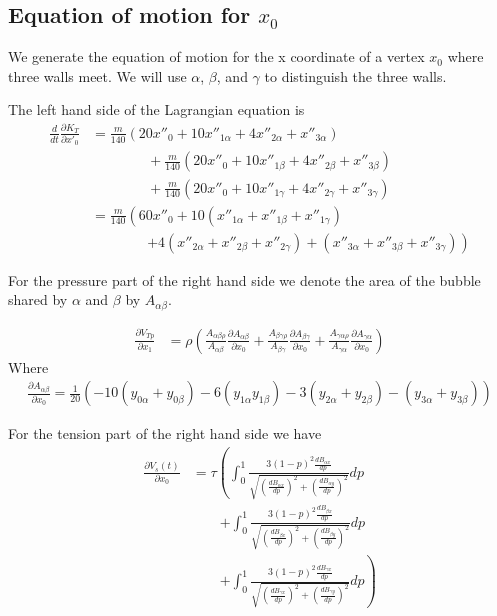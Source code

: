 \documentclass{article}
\begin{document}
\subsection{Equation of motion for $x_0$}
We generate the equation of motion for the x coordinate of a vertex $x_0$ where
three walls meet. We will use $\alpha$, $\beta$, and $\gamma$ to distinguish the
three walls.

The left hand side of the Lagrangian equation is 
\begin{align}
\frac{d}{d t} \frac{\partial K_T}{\partial x'_0}&=
\frac{m}{140}  \left( 20x''_0+10x''_{1\alpha}+4x''_{2\alpha}+x''_{3\alpha} \right)\\
&\qquad\qquad +\frac{m}{140}\left(
20x''_0+10x''_{1\beta}+4x''_{2\beta}+x''_{3\beta}\right)\nonumber\\ 
&\qquad\qquad +\frac{m}{140} \left(
20x''_0+10x''_{1\gamma}+4x''_{2\gamma}+x''_{3\gamma} \right)\nonumber\\
 &=\frac{m}{140} \left(
60x''_0
+10(x''_{1\alpha}+x''_{1\beta}+x''_{1\gamma})\right.\nonumber\\
&\qquad\qquad \left.+4(x''_{2\alpha}+x''_{2\beta}+x''_{2\gamma})
+(x''_{3\alpha}+x''_{3\beta}+x''_{3\gamma}) \right)\nonumber
\end{align}

For the pressure part of the right hand side we denote the area of the bubble
shared by $\alpha$ and $\beta$ by $A_{\alpha\beta}$.

\begin{align*}
\frac{\partial V_{Tp}}{\partial x_1} &= 
\rho \left(
\frac{A_{\alpha\beta\rho}}{A_{\alpha\beta}} \frac{\partial
A_{\alpha\beta}}{\partial x_0} 
+\frac{A_{\beta\gamma\rho}}{A_{\beta\gamma}} \frac{\partial
A_{\beta\gamma}}{\partial x_0} 
+\frac{A_{\gamma\alpha\rho}}{A_{\gamma\alpha}} \frac{\partial
A_{\gamma\alpha}}{\partial x_0} 
\right)
\end{align*}
Where
\begin{align*}
\frac{\partial A_{\alpha\beta}}{\partial x_0}=\frac{1}{20}
\left(-10(y_{0\alpha}+y_{0\beta})-6(y_{1\alpha}y_{1\beta})
-3(y_{2\alpha}+y_{2\beta})-(y_{3\alpha}+y_{3\beta})\right)
\end{align*}

For the tension part of the right hand side we have
\begin{align*}
\frac{\partial V_s(t)}{\partial x_0}&=
\tau\left(\int_0^1\frac{3(1-p)^2  \frac{d B_{\alpha x}}{dp}}{
  \sqrt{\left(\frac{d B_{\alpha x}}{dp}\right)^2+\left(\frac{d
B_{\alpha y}}{dp}\right)^2}} dp\right.\\
&\qquad \left.+\int_0^1\frac{3(1-p)^2  \frac{d B_{\beta x}}{dp}}{
  \sqrt{\left(\frac{d B_{\beta x}}{dp}\right)^2+\left(\frac{d
B_{\beta y}}{dp}\right)^2}} dp\right.\\
&\qquad \left.+\int_0^1\frac{3(1-p)^2  \frac{d B_{\gamma x}}{dp}}{
  \sqrt{\left(\frac{d B_{\gamma x}}{dp}\right)^2+\left(\frac{d
B_{\gamma y}}{dp}\right)^2}} dp
\right)
\end{align*}
\end{document}
